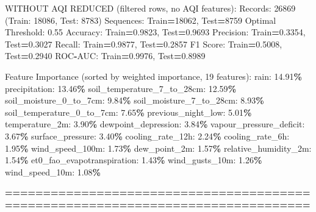 \documentclass[
  letterpaper,
  DIV=11,
  numbers=noendperiod]{scrartcl}
\newenvironment{Shaded}{\begin{snugshade}}{\end{snugshade}}
\newcommand{\BuiltInTok}[1]{#1}
\newcommand{\DecValTok}[1]{\textcolor[rgb]{0.00,0.00,0.81}{#1}}
\newcommand{\FloatTok}[1]{\textcolor[rgb]{0.00,0.00,0.81}{#1}}
\newcommand{\NormalTok}[1]{#1}
\newcommand{\OperatorTok}[1]{\textcolor[rgb]{0.81,0.36,0.00}{\textbf{#1}}}
\begin{document}
\begin{Shaded}
\begin{Highlighting}[]
\NormalTok{WITHOUT AQI REDUCED (filtered rows, no AQI features):}
\NormalTok{  Records: }\DecValTok{26869}\NormalTok{ (Train: }\DecValTok{18086}\NormalTok{, Test: }\DecValTok{8783}\NormalTok{)}
\NormalTok{  Sequences: Train}\OperatorTok{=}\DecValTok{18062}\NormalTok{, Test}\OperatorTok{=}\DecValTok{8759}
\NormalTok{  Optimal Threshold: }\FloatTok{0.55}
\NormalTok{  Accuracy: Train}\OperatorTok{=}\FloatTok{0.9823}\NormalTok{, Test}\OperatorTok{=}\FloatTok{0.9693}
\NormalTok{  Precision: Train}\OperatorTok{=}\FloatTok{0.3354}\NormalTok{, Test}\OperatorTok{=}\FloatTok{0.3027}
\NormalTok{  Recall: Train}\OperatorTok{=}\FloatTok{0.9877}\NormalTok{, Test}\OperatorTok{=}\FloatTok{0.2857}
\NormalTok{  F1 Score: Train}\OperatorTok{=}\FloatTok{0.5008}\NormalTok{, Test}\OperatorTok{=}\FloatTok{0.2940}
\NormalTok{  ROC}\OperatorTok{{-}}\NormalTok{AUC: Train}\OperatorTok{=}\FloatTok{0.9976}\NormalTok{, Test}\OperatorTok{=}\FloatTok{0.8989}

\NormalTok{  Feature Importance (}\BuiltInTok{sorted}\NormalTok{ by weighted importance, }\DecValTok{19}\NormalTok{ features):}
\NormalTok{    rain: }\FloatTok{14.91}\OperatorTok{\%}
\NormalTok{    precipitation: }\FloatTok{13.46}\OperatorTok{\%}
\NormalTok{    soil\_temperature\_7\_to\_28cm: }\FloatTok{12.59}\OperatorTok{\%}
\NormalTok{    soil\_moisture\_0\_to\_7cm: }\FloatTok{9.84}\OperatorTok{\%}
\NormalTok{    soil\_moisture\_7\_to\_28cm: }\FloatTok{8.93}\OperatorTok{\%}
\NormalTok{    soil\_temperature\_0\_to\_7cm: }\FloatTok{7.65}\OperatorTok{\%}
\NormalTok{    previous\_night\_low: }\FloatTok{5.01}\OperatorTok{\%}
\NormalTok{    temperature\_2m: }\FloatTok{3.90}\OperatorTok{\%}
\NormalTok{    dewpoint\_depression: }\FloatTok{3.84}\OperatorTok{\%}
\NormalTok{    vapour\_pressure\_deficit: }\FloatTok{3.67}\OperatorTok{\%}
\NormalTok{    surface\_pressure: }\FloatTok{3.40}\OperatorTok{\%}
\NormalTok{    cooling\_rate\_12h: }\FloatTok{2.24}\OperatorTok{\%}
\NormalTok{    cooling\_rate\_6h: }\FloatTok{1.95}\OperatorTok{\%}
\NormalTok{    wind\_speed\_100m: }\FloatTok{1.73}\OperatorTok{\%}
\NormalTok{    dew\_point\_2m: }\FloatTok{1.57}\OperatorTok{\%}
\NormalTok{    relative\_humidity\_2m: }\FloatTok{1.54}\OperatorTok{\%}
\NormalTok{    et0\_fao\_evapotranspiration: }\FloatTok{1.43}\OperatorTok{\%}
\NormalTok{    wind\_gusts\_10m: }\FloatTok{1.26}\OperatorTok{\%}
\NormalTok{    wind\_speed\_10m: }\FloatTok{1.08}\OperatorTok{\%}

\OperatorTok{================================================================================}


\end{Highlighting}
\end{Shaded}
\end{document}
